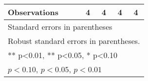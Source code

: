 \begin{table}[htbp]
\begin{tabular}{l*{4}{c}}
\midrule
Observations        &           4         &           4         &           4         &           4         \\
\bottomrule
\multicolumn{5}{l}{\footnotesize Standard errors in parentheses}\\
\multicolumn{5}{l}{\footnotesize Robust standard errors in parentheses.}\\
\multicolumn{5}{l}{\footnotesize *** p<0.01, ** p<0.05, * p<0.10}\\
\multicolumn{5}{l}{\footnotesize \sym{*} \(p<0.10\), \sym{**} \(p<0.05\), \sym{***} \(p<0.01\)}\\
\end{tabular}
\end{table}
